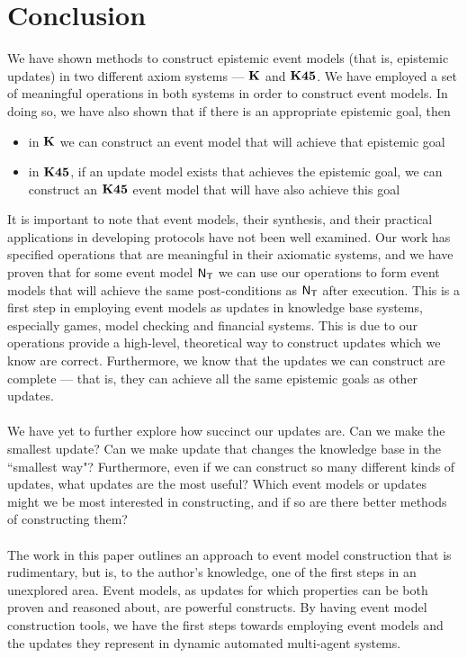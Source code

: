 \chapter{Conclusion}

We have shown methods to construct epistemic event models (that is, epistemic updates) in two different axiom systems --- $\bf K$
and $\bf K45$.
We have employed a set of meaningful operations in both systems in order to construct event models.
In doing so, we have also shown that if there is an appropriate epistemic goal, then
\begin{itemize}
	\item in $\bf K$ we can construct an event model that will achieve that epistemic goal
	\item in $\bf K45$, if an update model exists that achieves the epistemic goal, we can construct an
$\bf K45$ event model that will have also achieve this goal
\end{itemize}

It is important to note that event models, their synthesis, and their practical applications in
developing protocols have not been well examined.
Our work has specified operations that are meaningful in their axiomatic systems, and we have proven
that for some event model $\mathrm{\mathsf{N}}_\mathrm{\mathsf{T}}$ we can use our operations to form event models that will
achieve the same post-conditions as $\mathrm{\mathsf{N}}_\mathrm{\mathsf{T}}$ after execution.
This is a first step in employing event models as updates in knowledge base systems, especially
games, model checking and financial systems.
This is due to our operations provide a high-level, theoretical way to construct updates which we know are correct.
Furthermore, we know that the updates we can construct are complete --- that is, they can achieve
all the same epistemic goals as other updates.\\
\\
We have yet to further explore how succinct our updates are.
Can we make the smallest update?
Can we make update that changes the knowledge base in the ``smallest way"?
Furthermore, even if we can construct so many different kinds of updates, what updates are the most
useful?
Which event models or updates might we be most interested in constructing, and if so are there
better methods of constructing them?\\
\\
The work in this paper outlines an approach to event model construction that is rudimentary, but is,
to the author's knowledge, one of the first steps in an unexplored area.
Event models, as updates for which properties can be both proven and reasoned about, are powerful
constructs.
By having event model construction tools, we have the first steps towards employing event models and
the updates they represent in dynamic automated multi-agent systems.

